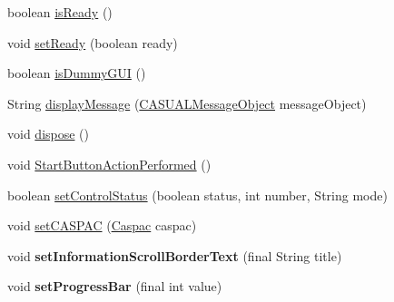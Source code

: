 \begin{DoxyCompactItemize}
\item 
boolean \hyperlink{classcom_1_1casual__dev_1_1jodin_1_1_j_odin_controller_a417a45520542d7fa8a6d603383fb8759}{is\-Ready} ()
\item 
void \hyperlink{classcom_1_1casual__dev_1_1jodin_1_1_j_odin_controller_aba5f250da60c1694735780b49b4c242d}{set\-Ready} (boolean ready)
\item 
boolean \hyperlink{classcom_1_1casual__dev_1_1jodin_1_1_j_odin_controller_a433c04dedd50cd92ce2685c0aa2fd790}{is\-Dummy\-G\-U\-I} ()
\item 
String \hyperlink{classcom_1_1casual__dev_1_1jodin_1_1_j_odin_controller_a3f87b0eb6a35210f1e0f5466df641f13}{display\-Message} (\hyperlink{class_c_a_s_u_a_l_1_1_c_a_s_u_a_l_message_object}{C\-A\-S\-U\-A\-L\-Message\-Object} message\-Object)
\item 
void \hyperlink{classcom_1_1casual__dev_1_1jodin_1_1_j_odin_controller_a84a6457990cc4a488ea0e7b2b4701dc3}{dispose} ()
\item 
void \hyperlink{classcom_1_1casual__dev_1_1jodin_1_1_j_odin_controller_a4d79b34ad0e40253ed9b8dfdbca28e48}{Start\-Button\-Action\-Performed} ()
\item 
boolean \hyperlink{classcom_1_1casual__dev_1_1jodin_1_1_j_odin_controller_a67a454d1fb8f1e8869fffc44a55dfebb}{set\-Control\-Status} (boolean status, int number, String mode)
\item 
void \hyperlink{classcom_1_1casual__dev_1_1jodin_1_1_j_odin_controller_a839bd5646c44e24f8e7654380cacf78d}{set\-C\-A\-S\-P\-A\-C} (\hyperlink{class_c_a_s_u_a_l_1_1caspac_1_1_caspac}{Caspac} caspac)
\item 
\hypertarget{classcom_1_1casual__dev_1_1jodin_1_1_j_odin_controller_a843965d1c999846034300d7045b6617f}{void {\bfseries set\-Information\-Scroll\-Border\-Text} (final String title)}\label{classcom_1_1casual__dev_1_1jodin_1_1_j_odin_controller_a843965d1c999846034300d7045b6617f}

\item 
\hypertarget{classcom_1_1casual__dev_1_1jodin_1_1_j_odin_controller_a827eff03d7238a033c6cc52ec289920d}{void {\bfseries set\-Progress\-Bar} (final int value)}\label{classcom_1_1casual__dev_1_1jodin_1_1_j_odin_controller_a827eff03d7238a033c6cc52ec289920d}


\end{DoxyCompactItemize}
